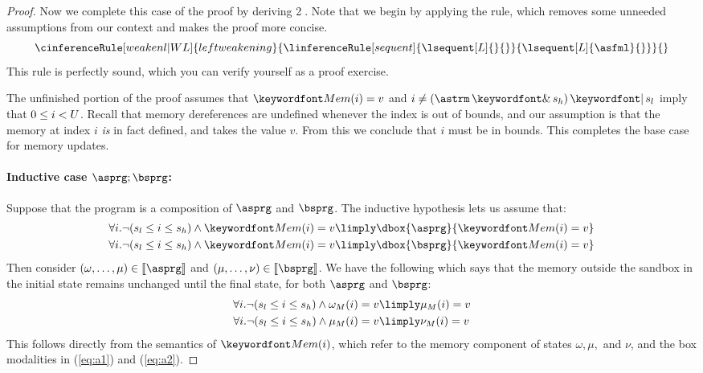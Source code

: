 \documentclass[11pt,twoside]{scrartcl}
\begin{document}
\begin{proof}
Now we complete this case of the proof by deriving \textcircled{2}.
Note that we begin by applying the  rule, which removes some unneeded assumptions from our context and makes the proof more concise.
\[
\cinferenceRule[weakenl|W\leftrule]{left weakening}
{\linferenceRule[sequent]
  {\lsequent[L]{}{}}
  {\lsequent[L]{\asfml}{}}
}{}%
\]
This rule is perfectly sound, which you can verify yourself as a proof exercise.
\begin{sequentdeduction}
 {
}
\end{sequentdeduction}
The unfinished portion of the proof assumes that $\pderef{i}=v$ and $i \ne (\astrm \bitand s_h) \bitor s_l$ imply that $0 \le i < U$. Recall that memory dereferences are undefined whenever the index is out of bounds, and our assumption is that the memory at index $i$ \emph{is} in fact defined, and takes the value $v$. From this we conclude that $i$ must be in bounds. This completes the base case for memory updates.

\paragraph{Inductive case $\asprg;\bsprg$:}
Suppose that the program is a composition of $\asprg$ and $\bsprg$. The inductive hypothesis lets us assume that:
\begin{align}
\label{eq:a1}
\forall i . \lnot(s_l \le i \le s_h)  \land \pderef{i}=v &\limply \dbox{\asprg}{\pderef{i}=v} \\
\label{eq:a2}
\forall i . \lnot(s_l \le i \le s_h)  \land \pderef{i}=v &\limply \dbox{\bsprg}{\pderef{i}=v}
\end{align}
Then consider $(\omega,\ldots,\mu) \in \llbracket\asprg\rrbracket$ and $(\mu,\ldots,\nu) \in \llbracket\bsprg\rrbracket$. We have the following which says that the memory outside the sandbox in the initial state remains unchanged until the final state, for both $\asprg$ and $\bsprg$:
\begin{align}
\label{eq:trans1}
\forall i . \lnot(s_l \le i \le s_h)  \land \omega_M(i)=v &\limply \mu_M(i)=v \\
\label{eq:trans2}
\forall i . \lnot(s_l \le i \le s_h)  \land \mu_M(i)=v &\limply \nu_M(i)=v
\end{align}
This follows directly from the semantics of $\pderef{i}$, which refer to the memory component of states $\omega, \mu,$ and $\nu$, and the box modalities in (\ref{eq:a1}) and (\ref{eq:a2}).


\end{proof}
\end{document}
